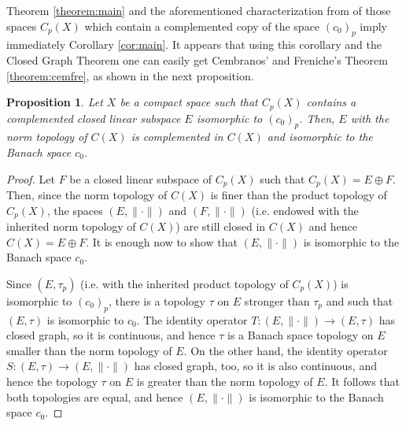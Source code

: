 \documentclass[11pt]{amsart}
\newtheorem{proposition}[theorem]{Proposition}
\newtheorem{corollary}[theorem]{Corollary}
\theoremstyle{definition}
\theoremstyle{remark}
\numberwithin{equation}{section}
\newcommand{\noproof}{\hfill$\Box$}
\begin{document}



Theorem \ref{theorem:main} and the aforementioned characterization from \cite{BKS19} of those spaces $C_p(X)$ which contain a complemented copy of the space $(c_0)_p$ imply immediately Corollary \ref{cor:main}. It appears that using this corollary and the Closed Graph Theorem one can easily get Cembranos' and Freniche's Theorem \ref{theorem:cemfre}, as shown in the next proposition.

\begin{proposition}\label{prop:c0p_c0}
Let $X$ be a compact space such that $C_p(X)$ contains a
complemented closed linear subspace $E$ isomorphic to $(c_0)_p$. Then, $E$ with the norm topology of $C(X)$ is complemented in $C(X)$ and isomorphic to
the Banach space $c_0$.
\end{proposition}
\begin{proof}
Let $F$ be a closed linear subspace of $C_p(X)$ such that $C_p(X)=E\oplus
F$. Then,  since the norm topology of $C(X)$ is finer than the
product topology of $C_p(X)$, the spaces $(E,\|\cdot\|)$ and
$(F,\|\cdot\|)$ (i.e. endowed with the inherited norm topology of
$C(X)$) are still closed in $C(X)$ and hence $C(X)=E\oplus F$. It is
enough now to show that $(E,\|\cdot\|)$ is isomorphic to the Banach
space $c_0$. 

Since $(E,\tau_p)$ (i.e. with the inherited product
topology of $C_p(X)$) is isomorphic to $(c_0)_p$, there is a
topology $\tau$ on $E$ stronger than $\tau_p$ and such that $(E,\tau)$ is isomorphic to $c_0$. The identity operator $T\colon(E,\|\cdot\|)\to(E,\tau)$ has closed graph, so it is continuous, and hence $\tau$ is a Banach
space topology on $E$ smaller than the norm topology of $E$. On the
other hand, the identity operator $S\colon(E,\tau)\to(E,\|\cdot\|)$
has closed graph, too, so it is also continuous, and hence the
topology $\tau$ on $E$ is greater than the norm topology of $E$. It
follows that both topologies are equal, and hence
$(E,\|\cdot\|)$ is isomorphic to the Banach space $c_0$.
\end{proof}
\end{document}
